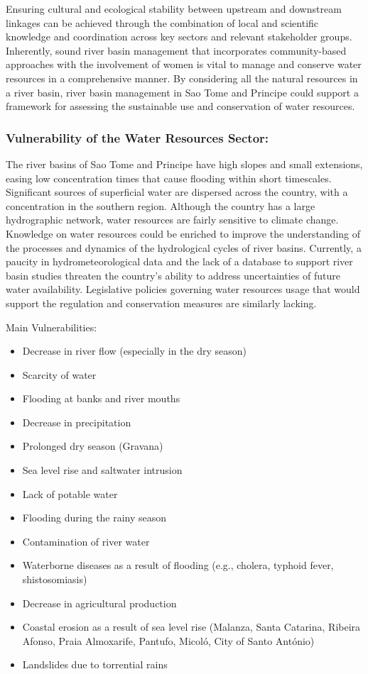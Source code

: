\documentclass[
]{book}
\providecommand{\tightlist}{%
  \setlength{\itemsep}{0pt}\setlength{\parskip}{0pt}}
\begin{document}
Ensuring cultural and ecological stability between upstream and downstream linkages can be achieved through the combination of local and scientific knowledge and coordination across key sectors and relevant stakeholder groups. Inherently, sound river basin management that incorporates community-based approaches with the involvement of women is vital to manage and conserve water resources in a comprehensive manner. By considering all the natural resources in a river basin, river basin management in Sao Tome and Principe could support a framework for assessing the sustainable use and conservation of water resources.

\hypertarget{vulnerability-of-the-water-resources-sector}{%
\subsubsection{Vulnerability of the Water Resources Sector:}\label{vulnerability-of-the-water-resources-sector}}

The river basins of Sao Tome and Principe have high slopes and small extensions, easing low concentration times that cause flooding within short timescales. Significant sources of superficial water are dispersed across the country, with a concentration in the southern region. Although the country has a large hydrographic network, water resources are fairly sensitive to climate change. Knowledge on water resources could be enriched to improve the understanding of the processes and dynamics of the hydrological cycles of river basins. Currently, a paucity in hydrometeorological data and the lack of a database to support river basin studies threaten the country's ability to address uncertainties of future water availability. Legislative policies governing water resources usage that would support the regulation and conservation measures are similarly lacking.

Main Vulnerabilities:

\begin{itemize}
\tightlist
\item
  Decrease in river flow (especially in the dry season)
\item
  Scarcity of water
\item
  Flooding at banks and river mouths
\item
  Decrease in precipitation
\item
  Prolonged dry season (Gravana)
\item
  Sea level rise and saltwater intrusion
\item
  Lack of potable water
\item
  Flooding during the rainy season
\item
  Contamination of river water
\item
  Waterborne diseases as a result of flooding (e.g., cholera, typhoid fever, shistosomiasis)
\item
  Decrease in agricultural production
\item
  Coastal erosion as a result of sea level rise (Malanza, Santa Catarina, Ribeira Afonso, Praia Almoxarife, Pantufo, Micoló, City of Santo António)
\item
  Landslides due to torrential rains
\end{itemize}
\end{document}
